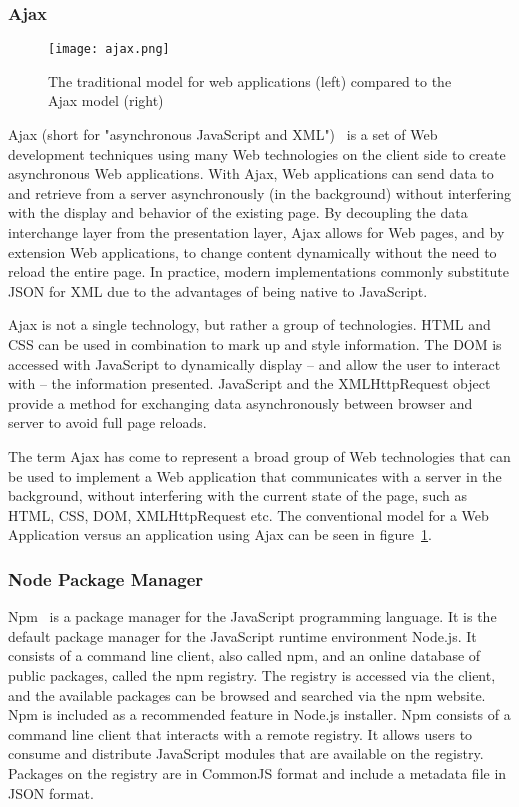 \subsubsection{Ajax}
\label{ajax}
\begin{figure}
	\centerline{\texttt{[image: ajax.png]}}
	\caption{The traditional model for web applications (left) compared to the Ajax model (right)}
	\label{ajaxPNG}
\end{figure}
Ajax (short for "asynchronous JavaScript and XML")~\cite{garrett2005ajax} is a set of Web development techniques using many Web technologies on the client side to create asynchronous Web applications. With Ajax, Web applications can send data to and retrieve from a server asynchronously (in the background) without interfering with the display and behavior of the existing page. By decoupling the data interchange layer from the presentation layer, Ajax allows for Web pages, and by extension Web applications, to change content dynamically without the need to reload the entire page. In practice, modern implementations commonly substitute JSON for XML due to the advantages of being native to JavaScript.\par
Ajax is not a single technology, but rather a group of technologies. HTML and CSS can be used in combination to mark up and style information. The DOM is accessed with JavaScript to dynamically display – and allow the user to interact with – the information presented. JavaScript and the XMLHttpRequest object provide a method for exchanging data asynchronously between browser and server to avoid full page reloads.\par 
The term Ajax has come to represent a broad group of Web technologies that can be used to implement a Web application that communicates with a server in the background, without interfering with the current state of the page, such as HTML, CSS, DOM, XMLHttpRequest etc. The conventional model for a Web Application versus an application using Ajax can be seen in figure~\ref{ajaxPNG}.

\subsubsection{Node Package Manager}
Npm~\cite{schlueternode} is a package manager for the JavaScript programming language. It is the default package manager for the JavaScript runtime environment Node.js. It consists of a command line client, also called npm, and an online database of public packages, called the npm registry. The registry is accessed via the client, and the available packages can be browsed and searched via the npm website. Npm is included as a recommended feature in Node.js installer. Npm consists of a command line client that interacts with a remote registry. It allows users to consume and distribute JavaScript modules that are available on the registry. Packages on the registry are in CommonJS format and include a metadata file in JSON format.

